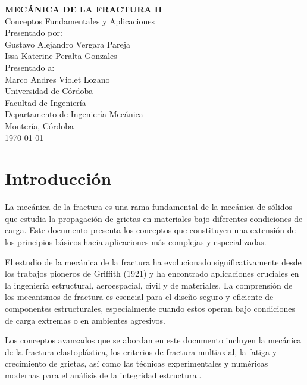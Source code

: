 \documentclass[12pt,letterpaper]{article}
\begin{document}
\begin{titlepage}
\centering

{\Large\textbf{MECÁNICA DE LA FRACTURA II}}\\[0.5cm]
{\large Conceptos Fundamentales y Aplicaciones}\\[2cm]

{\large Presentado por:}\\[0.5cm]
{\large Gustavo Alejandro Vergara Pareja}\\%
{\large Issa Katerine Peralta Gonzales}\\[2cm]

{\large Presentado a:}\\[0.5cm]
{\large Marco Andres Violet Lozano}\\[2cm]

{\large Universidad de Córdoba}\\
{\large Facultad de Ingeniería}\\
{\large Departamento de Ingeniería Mecánica}\\[5cm]

{\large Montería, Córdoba}\\
{\large \today}

\end{titlepage}

\newpage
\tableofcontents
\newpage

\section{Introducción}

La mecánica de la fractura es una rama fundamental de la mecánica de sólidos que estudia la propagación de grietas en materiales bajo diferentes condiciones de carga. Este documento presenta los conceptos que constituyen una extensión de los principios básicos hacia aplicaciones más complejas y especializadas.

El estudio de la mecánica de la fractura ha evolucionado significativamente desde los trabajos pioneros de Griffith (1921) y ha encontrado aplicaciones cruciales en la ingeniería estructural, aeroespacial, civil y de materiales. La comprensión de los mecanismos de fractura es esencial para el diseño seguro y eficiente de componentes estructurales, especialmente cuando estos operan bajo condiciones de carga extremas o en ambientes agresivos.

Los conceptos avanzados que se abordan en este documento incluyen la mecánica de la fractura elastoplástica, los criterios de fractura multiaxial, la fatiga y crecimiento de grietas, así como las técnicas experimentales y numéricas modernas para el análisis de la integridad estructural.
\end{document}
